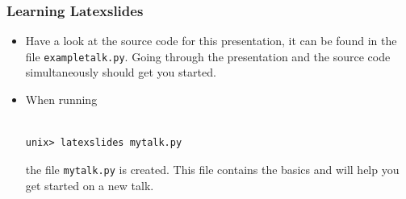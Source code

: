 \documentclass{beamer}
\newcommand{\emp}[1]{{\smaller\texttt{#1}}}
\begin{document}
\begin{frame}[fragile]
\frametitle{Learning Latexslides}

\begin{block}

\begin{itemize}
\item Have a look at the source code for this presentation, it can be found in the file \emp{exampletalk.py}. Going through the presentation and the source code simultaneously should get you started.
\end{itemize}

\end{block}
\begin{block}

\begin{itemize}
\item When running\begin{Verbatim}[fontsize=\footnotesize,tabsize=4,baselinestretch=0.85,fontfamily=tt,xleftmargin=7mm]

unix> latexslides mytalk.py
\end{Verbatim}
the file \emp{mytalk.py} is created. This file contains the basics and will help you get started on a new talk.
\end{itemize}

\end{block}

\end{frame}
\end{document}
